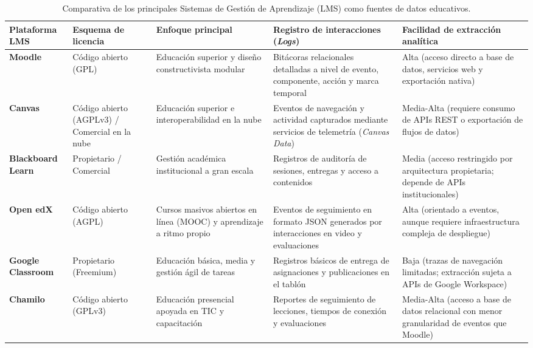 \begin{table}[htbp]
\centering
\caption{Comparativa de los principales Sistemas de Gestión de Aprendizaje (LMS) como fuentes de datos educativos.}
\label{tab:comparativa_lms}
\footnotesize
\setlength{\tabcolsep}{4pt}
\renewcommand{\arraystretch}{1.3}
\begin{tabular}{p{} p{} p{} p{} p{}}
\hline
\textbf{Plataforma LMS} & \textbf{Esquema de licencia} & \textbf{Enfoque principal} & \textbf{Registro de interacciones (\textit{Logs})} & \textbf{Facilidad de extracción analítica} \\ \hline
\textbf{Moodle} & Código abierto (GPL) & Educación superior y diseño constructivista modular & Bitácoras relacionales detalladas a nivel de evento, componente, acción y marca temporal & Alta (acceso directo a base de datos, servicios web y exportación nativa) \\
\textbf{Canvas} & Código abierto (AGPLv3) / Comercial en la nube & Educación superior e interoperabilidad en la nube & Eventos de navegación y actividad capturados mediante servicios de telemetría (\textit{Canvas Data}) & Media-Alta (requiere consumo de APIs REST o exportación de flujos de datos) \\
\textbf{Blackboard Learn} & Propietario / Comercial & Gestión académica institucional a gran escala & Registros de auditoría de sesiones, entregas y acceso a contenidos & Media (acceso restringido por arquitectura propietaria; depende de APIs institucionales) \\
\textbf{Open edX} & Código abierto (AGPL) & Cursos masivos abiertos en línea (MOOC) y aprendizaje a ritmo propio & Eventos de seguimiento en formato JSON generados por interacciones en video y evaluaciones & Alta (orientado a eventos, aunque requiere infraestructura compleja de despliegue) \\
\textbf{Google Classroom} & Propietario (Freemium) & Educación básica, media y gestión ágil de tareas & Registros básicos de entrega de asignaciones y publicaciones en el tablón & Baja (trazas de navegación limitadas; extracción sujeta a APIs de Google Workspace) \\
\textbf{Chamilo} & Código abierto (GPLv3) & Educación presencial apoyada en TIC y capacitación & Reportes de seguimiento de lecciones, tiempos de conexión y evaluaciones & Media-Alta (acceso a base de datos relacional con menor granularidad de eventos que Moodle) \\ \hline
\end{tabular}
\end{table}

